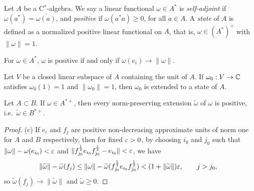 \documentclass{../../large}
\begin{document}
\begin{prb}[States]
Let $A$ be a C$^*$-algebra.
We say a linear functional $\omega\in A^*$ is \emph{self-adjoint} if $\omega(a^*)=\bar{\omega(a)}$, and \emph{positive} if $\omega(a^*a)\ge0$, for all $a\in A$.
A \emph{state} of $A$ is defined as a normalized positive linear functional on $A$, that is, $\omega\in(A^*)^+$ with $\|\omega\|=1$.
\begin{parts}
\item For $\omega\in A^*$, $\omega$ is positive if and only if $\omega(e_i)\to\|\omega\|$.
\item Let $V$ be a closed linear subspace of $A$ containing the unit of $A$. If $\omega_0:V\to\mathbb{C}$ satisfies $\omega_0(1)=1$ and $\|\omega_0\|=1$, then $\omega_0$ is extended to a state of $A$.
\item Let $A\subset B$. If $\omega\in A^{*+}$, then every norm-preserving extension $\tilde\omega$ of $\omega$ is positive, i.e.~$\tilde\omega\in B^{*+}$.
\end{parts}
\end{prb}
\begin{proof}

(c)
If $e_i$ and $f_j$ are positive non-decreasing approximate units of norm one for $A$ and $B$ respectively, then for fixed $\varepsilon>0$, by choosing $i_0$ and $j_0$ such that $\|\omega\|-\omega(e_{i_0})<\varepsilon$ and $\|f_{j_0}^{\frac12}e_{i_0}f_{j_0}^{\frac12}-e_{i_0}\|<\varepsilon$, we have
\[\|\widetilde\omega\|-\widetilde\omega(f_j)\le\|\omega\|-\widetilde\omega(f_{j_0}^{\frac12}e_{i_0}f_{j_0}^{\frac12})<(1+\|\widetilde\omega\|)\varepsilon,\qquad j>j_0,\]
so $\tilde\omega(f_j)\to\|\tilde\omega\|$ and $\tilde\omega\ge0$.
\end{proof}
\end{document}
